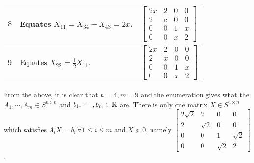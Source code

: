 \begin{table}[]
\begin{tabular}{|l|p{}|l|}
$8$                                                              & Equates $X_{11} = X_{34}+X_{43} = 2x$.                                                                                          & $\begin{bmatrix}2x&2 &0 &0\\2&c&0 &0\\0&0&1&x\\0&0&x&2\end{bmatrix}$      \\ \hline
$9$                                                              & Equates $X_{22} = \frac{1}{2}X_{11}$.                                                                                           & $\begin{bmatrix}2x&2 &0 &0\\2&x&0 &0\\0&0&1&x\\0&0&x&2\end{bmatrix}$      \\ \hline
\end{tabular}
\end{table}

From the above, it is clear that $n=4, m=9$ and the enumeration gives what the $A_{1},\cdots,A_{m}\in S^{n\times n}$ and $b_{1},\cdots,b_{m}\in \mathbb{R}$ are. There is only one matrix $X\in S^{n\times n}$ which satisfies $A_{i}X=b_{i}~\forall 1\le i\le m$ and $X\succeq0$, namely $\begin{bmatrix}2\sqrt2&2 &0 &0\\2&\sqrt2&0 &0\\0&0&1&\sqrt2\\0&0&\sqrt2&2\end{bmatrix}$.






